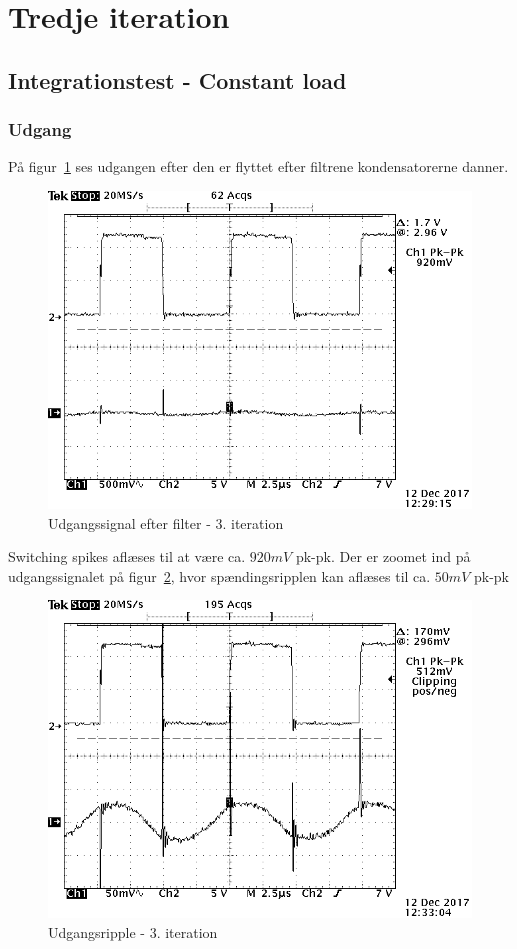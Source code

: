 \section{Tredje iteration}

\subsection{Integrationstest - Constant load}
\subsubsection{Udgang}
\noindent På figur~\ref{fig:realisering_udgang_e_filter_3} ses udgangen efter den er flyttet efter filtrene kondensatorerne danner. 
\begin{figure}[H]
	\center
	\includegraphics[max width=0.7\linewidth]{../dokumentation/tex/3iteration/billeder/Realisering/udgang_e_filter_3iteration.png}
	\caption{Udgangssignal efter filter - 3. iteration}
	\label{fig:realisering_udgang_e_filter_3}
\end{figure}
\noindent Switching spikes aflæses til at være ca. $920mV$ pk-pk.
Der er zoomet ind på udgangssignalet på figur~\ref{fig:realisering_udgang_e_filter_zoom_3}, hvor spændingsripplen kan aflæses til ca. $50mV$ pk-pk

\begin{figure}[H]
	\center
	\includegraphics[max width=0.7\linewidth]{../dokumentation/tex/3iteration/billeder/Realisering/udgang_e_filter_3iteration_zoom.png}
	\caption{Udgangsripple - 3. iteration}
	\label{fig:realisering_udgang_e_filter_zoom_3}
\end{figure}

